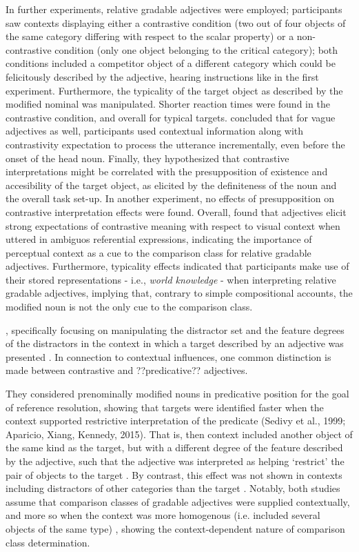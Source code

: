  In further experiments, relative gradable adjectives were employed; participants saw contexts displaying either a contrastive condition (two out of four objects of the same category differing with respect to the scalar property) or a non-contrastive condition (only one object belonging to the critical category); both conditions included a competitor object of a different category which could be felicitously described by the adjective, hearing instructions like in the first experiment. Furthermore, the typicality of the target object as described by the modified nominal was manipulated. Shorter reaction times were found in the contrastive condition, and overall for typical targets. \textcite{sedivy1999} concluded that for vague adjectives as well, participants used contextual information along with contrastivity expectation to process the utterance incrementally, even before the onset of the head noun. Finally, they hypothesized that contrastive interpretations might be correlated with the presupposition of existence and accesibility of the target object, as elicited by the definiteness of the noun and the overall task set-up. In another experiment,  no effects of presupposition on contrastive interpretation effects were found. Overall, \textcite{sedivy1999} found that adjectives elicit strong expectations of contrastive meaning with respect to visual context when uttered in ambiguos referential expressions, indicating the importance of perceptual context as a cue to the comparison class for relative gradable adjectives. Furthermore, typicality effects indicated that participants make use of their stored representations - i.e., \textit{world knowledge} - when interpreting relative gradable adjectives, implying that, contrary to simple compositional accounts, the modified noun is not the only cue to the comparison class. 
 
, specifically focusing on manipulating the distractor set and the feature degrees of the distractors in the context in which a target described by an adjective was presented \parencite[e.g.,]{sedivy1999, Aparicio2016}. In connection to contextual influences, one common distinction is made between contrastive and ??predicative?? adjectives. 

  
They considered prenominally modified nouns in predicative position for the goal of reference resolution, showing that targets were identified faster when the context supported restrictive interpretation of the predicate (Sedivy et al., 1999; Aparicio, Xiang, Kennedy, 2015). That is, then context included another object of the same kind as the target, but with a different degree of the feature described by the adjective, such that the adjective was interpreted as helping ‘restrict’ the pair of objects to the target . By contrast, this effect was not shown in contexts including distractors of other categories than the target \parencite{Aparicio2016}. 
Notably, both studies assume that comparison classes of gradable adjectives were supplied contextually, and more so when the context was more homogenous (i.e. included several objects of the same type) \parencite[cf.][]{Aparicio2016}, showing the context-dependent nature of comparison class determination. 

